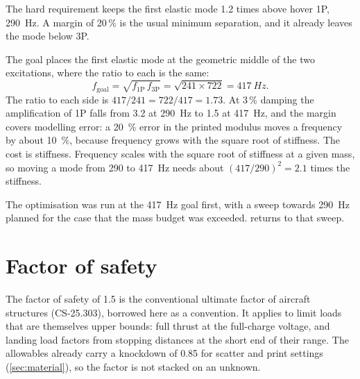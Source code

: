 The hard requirement keeps the first elastic mode 1.2 times above hover 1P, \SI{290}{Hz}. A margin of 20\,\% is the usual minimum separation, and it already leaves the mode below 3P.

The goal places the first elastic mode at the geometric middle of the two excitations, where the ratio to each is the same:
\begin{equation}
f_\text{goal} = \sqrt{f_\text{1P}\, f_\text{3P}} = \sqrt{241 \times 722} = \SI{417}{Hz}.
\end{equation}
The ratio to each side is $417/241 = 722/417 = 1.73$. At 3\,\% damping the amplification of 1P falls from 3.2 at \SI{290}{Hz} to 1.5 at \SI{417}{Hz}, and the margin covers modelling error: a \SI{20}{\percent} error in the printed modulus moves a frequency by about \SI{10}{\percent}, because frequency grows with the square root of stiffness. The cost is stiffness. Frequency scales with the square root of stiffness at a given mass, so moving a mode from 290 to \SI{417}{Hz} needs about $(417/290)^2 = 2.1$ times the stiffness.

The optimisation was run at the \SI{417}{Hz} goal first, with a sweep towards \SI{290}{Hz} planned for the case that the mass budget was exceeded.  returns to that sweep.

\section{Factor of safety}\label{sec:req-fos}

The factor of safety of 1.5 is the conventional ultimate factor of aircraft structures (CS-25.303), borrowed here as a convention. It applies to limit loads that are themselves upper bounds: full thrust at the full-charge voltage, and landing load factors from stopping distances at the short end of their range. The allowables already carry a knockdown of 0.85 for scatter and print settings (\cref{sec:material}), so the factor is not stacked on an unknown.
